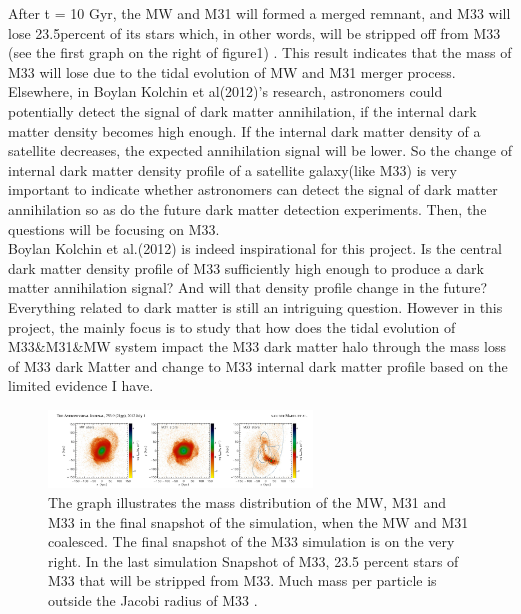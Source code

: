 \documentclass[twocolumn]{aastex63}
\begin{document}
\indent After t = 10 Gyr, the MW and M31 will formed a merged remnant, and M33 will lose 23.5percent of its stars which, in other words, will be stripped off from M33 (see the first graph on the right of figure1) \citep{marel12}.  This result indicates that the mass of M33 will lose due to the tidal evolution of MW and M31 merger process. Elsewhere, in Boylan Kolchin et al(2012)'s research, astronomers could potentially detect the signal of dark matter annihilation, if the internal dark matter density becomes high enough\citep{boylan11}. If the internal dark matter density of a satellite decreases, the expected annihilation signal will be lower. So the change of internal dark matter density profile of a satellite galaxy(like M33) is very important to indicate whether astronomers can detect the signal of dark matter annihilation so as do the future dark matter detection experiments.  Then, the questions will be focusing on M33.\\

\indent Boylan Kolchin et al.(2012) is indeed inspirational for this project. Is the central dark matter density profile of M33 sufficiently high enough to produce a dark matter annihilation signal? And will that density profile change in the future? Everything related to dark matter is still an intriguing question. However in this project, the mainly focus is to study that how does the tidal evolution of M33&M31&MW system impact the M33 dark matter halo through the mass loss of M33 dark Matter and change to M33 internal dark matter profile based on the limited evidence I have. 
\begin{figure}[H]
    \centering
    \includegraphics[width=7cm]{f1.png}
    \caption{The graph illustrates the mass distribution of the MW, M31 and M33 in the final snapshot of the simulation, when the MW and M31 coalesced. The final snapshot of the M33 simulation is on the very right. In the last simulation Snapshot of M33, 23.5 percent stars of M33 that will be stripped from M33. Much mass per particle is outside the Jacobi radius of M33 \cite{marel12}.}
    \label{marelfigure}
\end{figure} 
\end{document}
